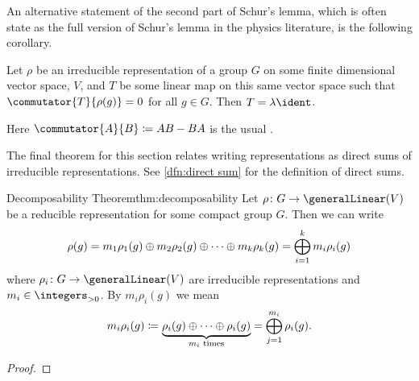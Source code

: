 An alternative statement of the second part of Schur's lemma, which is often
state as the full version of Schur's lemma in the physics literature, is the
following corollary.
\begin{crl}{}{}
    Let \(\rho\) be an irreducible representation of a group \(G\) on some
    finite dimensional vector space, \(V\), and \(T\) be some linear map on this
    same vector space such that \(\commutator{T}{\rho(g)} = 0\) for all \(g \in G\).
    Then \(T = \lambda\ident\).
    
    \begin{rmk}
        Here \(\commutator{A}{B} \coloneqq AB - BA\) is the usual
        .
    \end{rmk}
\end{crl}

The final theorem for this section relates writing representations as direct
sums of irreducible representations.
See \cref{dfn:direct sum} for the definition of direct sums.

\begin{thm}{Decomposability Theorem}{thm:decomposability}
    Let \(\rho \colon G \to \generalLinear(V)\) be a reducible
    representation for some compact group \(G\).
    Then we can write
    \begin{equation}
        \rho(g) = m_1 \rho_1(g) \oplus m_2 \rho_2(g) \oplus \dotsb
        \oplus m_k\rho_k(g) = \bigoplus_{i=1}^{k} m_i\rho_i(g)
    \end{equation}
    where \(\rho_i \colon G \to \generalLinear(V)\) are irreducible
    representations and \(m_i \in \positiveintegers\).
    By \(m_i \rho_i(g)\) we mean
    \begin{equation}
        m_i \rho_i(g) \coloneqq \underbrace{\rho_i(g) \oplus \dotsb
            \oplus \rho_i(g)}_{m_i \text{ times}} = \bigoplus_{j = 1}^{m_i} \rho_i(g).
    \end{equation}
    
    \begin{proof}
    \end{proof}
\end{thm}

